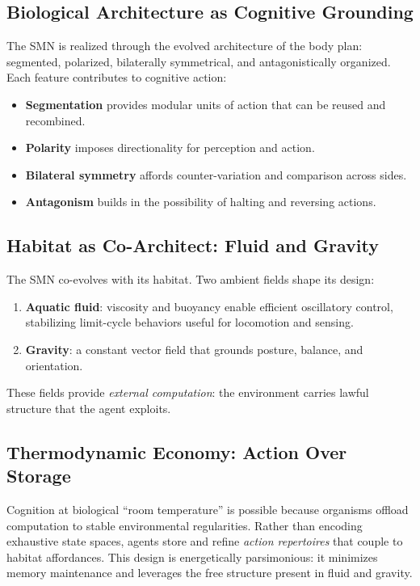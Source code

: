 \subsection{Biological Architecture as Cognitive Grounding}
\label{subsec:bio-arch}
The SMN is realized through the evolved architecture of the body plan: segmented, polarized, 
bilaterally symmetrical, and antagonistically organized. Each feature contributes to cognitive action:
\begin{itemize}
    \item \textbf{Segmentation} provides modular units of action that can be reused and recombined.
    \item \textbf{Polarity} imposes directionality for perception and action.
    \item \textbf{Bilateral symmetry} affords counter-variation and comparison across sides.
    \item \textbf{Antagonism} builds in the possibility of halting and reversing actions.
\end{itemize}

\subsection{Habitat as Co-Architect: Fluid and Gravity}
\label{subsec:habitat}
The SMN co-evolves with its habitat. Two ambient fields shape its design:
\begin{enumerate}
    \item \textbf{Aquatic fluid}: viscosity and buoyancy enable efficient oscillatory control, 
    stabilizing limit-cycle behaviors useful for locomotion and sensing.
    \item \textbf{Gravity}: a constant vector field that grounds posture, balance, and orientation.
\end{enumerate}
These fields provide \emph{external computation}: the environment carries lawful structure that the agent exploits.

\subsection{Thermodynamic Economy: Action Over Storage}
Cognition at biological ``room temperature'' is possible because organisms offload computation to stable environmental regularities. 
Rather than encoding exhaustive state spaces, agents store and refine \emph{action repertoires} that couple to habitat affordances. 
This design is energetically parsimonious: it minimizes memory maintenance and leverages the free structure present in fluid and gravity.

